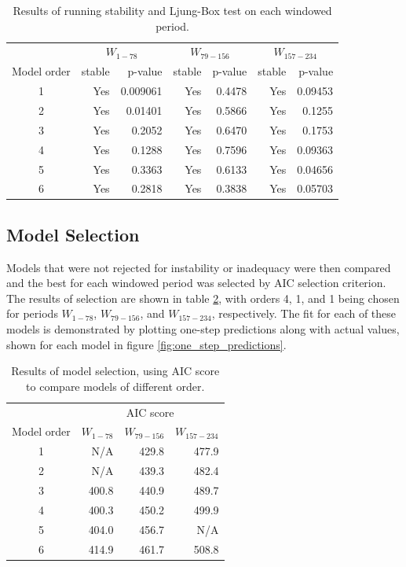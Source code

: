 \documentclass[a4paper]{scrartcl}
\begin{document}
\begin{table}[h!]
  \centering
  \begin{tabular}{ c | r r | r r | r r }
      & \multicolumn{2}{|c|}{$W_{1-78}$} & \multicolumn{2}{|c|}{$W_{79-156}$} & \multicolumn{2}{|c}{$W_{157-234}$} \\
    Model order & stable & p-value & stable & p-value & stable & p-value \\
    \hline
    1 & Yes & 0.009061 & Yes & 0.4478 & Yes & 0.09453 \\
    2 & Yes & 0.01401 & Yes & 0.5866 & Yes & 0.1255 \\
    3 & Yes & 0.2052 & Yes & 0.6470 & Yes & 0.1753 \\
    4 & Yes & 0.1288 & Yes & 0.7596 & Yes & 0.09363 \\ 
    5 & Yes & 0.3363 & Yes & 0.6133 & Yes & 0.04656 \\
    6 & Yes & 0.2818 & Yes & 0.3838 & Yes & 0.05703 \\
    \hline
  \end{tabular}
\caption{Results of running stability and Ljung-Box test on each windowed period.}
\label{tab:diagnostic_results}
\end{table}

\subsection*{Model Selection}
Models that were not rejected for instability or inadequacy were then compared and the best for each windowed period was selected by AIC selection criterion. The results of selection are shown in table \ref{tab:selection_results}, with orders 4, 1, and 1 being chosen for periods $W_{1-78}$, $W_{79-156}$, and $W_{157-234}$, respectively. The fit for each of these models is demonstrated by plotting one-step predictions along with actual values, shown for each model in figure \ref{fig:one_step_predictions}.

\begin{table}[h!]
  \centering
  \begin{tabular}{ c | r | r | r }
    ~ & \multicolumn{3}{|c}{AIC score} \\
    Model order & $W_{1-78}$ & $W_{79-156}$ & $W_{157-234}$ \\
    \hline
    1 & N/A & 429.8 & 477.9 \\
    2 & N/A & 439.3 & 482.4 \\
    3 & 400.8 & 440.9 & 489.7 \\
    4 & 400.3 & 450.2 & 499.9 \\ 
    5 & 404.0 & 456.7 & N/A \\
    6 & 414.9 & 461.7 & 508.8 \\
    \hline
  \end{tabular}
\caption{Results of model selection, using AIC score to compare models of different order.}
\label{tab:selection_results}
\end{table}
\end{document}

